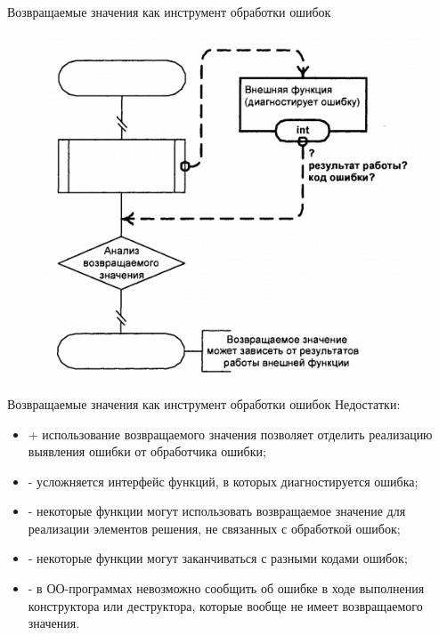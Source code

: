 \documentclass{beamer}
\begin{document}
\begin{frame}{Возвращаемые значения как инструмент обработки ошибок}
\begin{figure}[h]
\centering
\includegraphics[scale=0.5]{images/lec08-pic01.png}
\end{figure}
\end{frame}

\begin{frame}{Возвращаемые значения как инструмент обработки ошибок}
Недостатки: 
\begin{itemize}
\item + использование возвращаемого значения позволяет отделить реализацию выявления ошибки от обработчика ошибки; 
\item - усложняется интерфейс функций, в которых диагностируется ошибка;
\item - некоторые функции могут использовать возвращаемое значение для реализации элементов решения, не связанных с обработкой ошибок; 
\item - некоторые функции могут заканчиваться с разными кодами ошибок;
\item - в ОО-программах невозможно сообщить об ошибке в ходе выполнения конструктора или деструктора, которые вообще не имеет возвращаемого значения.
\end{itemize}
\end{frame}
\end{document}

